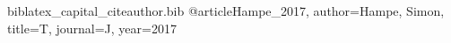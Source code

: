 \begin{filecontents*}{biblatex_capital_citeauthor.bib}
@article{Hampe_2017, author={Hampe, Simon}, title={T}, journal={J}, year={2017}}
\end{filecontents*}
\documentclass{article}
\usepackage[style=numeric]{biblatex}


 showed it.

